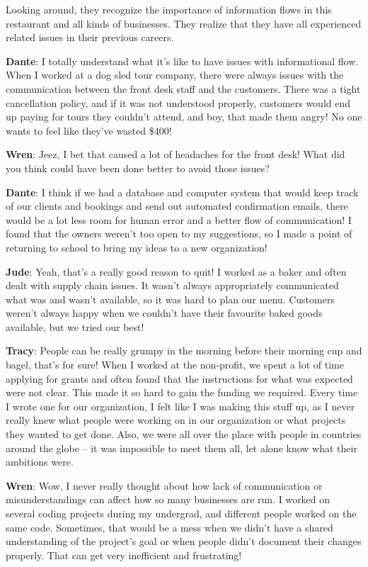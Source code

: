 \documentclass[
  letterpaper,
  DIV=11,
  numbers=noendperiod]{scrreprt}
\begin{document}
Looking around, they recognize the importance of information flows in
this restaurant and all kinds of businesses. They realize that they have
all experienced related issues in their previous careers.

\textbf{Dante}: I totally understand what it's like to have issues with
informational flow. When I worked at a dog sled tour company, there were
always issues with the communication between the front desk staff and
the customers. There was a tight cancellation policy, and if it was not
understood properly, customers would end up paying for tours they
couldn't attend, and boy, that made them angry! No one wants to feel
like they've wasted \$400!

\textbf{Wren}: Jeez, I bet that caused a lot of headaches for the front
desk! What did you think could have been done better to avoid those
issues?

\textbf{Dante}: I think if we had a database and computer system that
would keep track of our clients and bookings and send out automated
confirmation emails, there would be a lot less room for human error and
a better flow of communication! I found that the owners weren't too open
to my suggestions, so I made a point of returning to school to bring my
ideas to a new organization!

\textbf{Jude}: Yeah, that's a really good reason to quit! I worked as a
baker and often dealt with supply chain issues. It wasn't always
appropriately communicated what was and wasn't available, so it was hard
to plan our menu. Customers weren't always happy when we couldn't have
their favourite baked goods available, but we tried our best!

\textbf{Tracy}: People can be really grumpy in the morning before their
morning cup and bagel, that's for sure! When I worked at the non-profit,
we spent a lot of time applying for grants and often found that the
instructions for what was expected were not clear. This made it so hard
to gain the funding we required. Every time I wrote one for our
organization, I felt like I was making this stuff up, as I never really
knew what people were working on in our organization or what projects
they wanted to get done. Also, we were all over the place with people in
countries around the globe -- it was impossible to meet them all, let
alone know what their ambitions were.

\textbf{Wren}: Wow, I never really thought about how lack of
communication or misunderstandings can affect how so many businesses are
run. I worked on several coding projects during my undergrad, and
different people worked on the same code. Sometimes, that would be a
mess when we didn't have a shared understanding of the project's goal or
when people didn't document their changes properly. That can get very
inefficient and frustrating!
\end{document}
